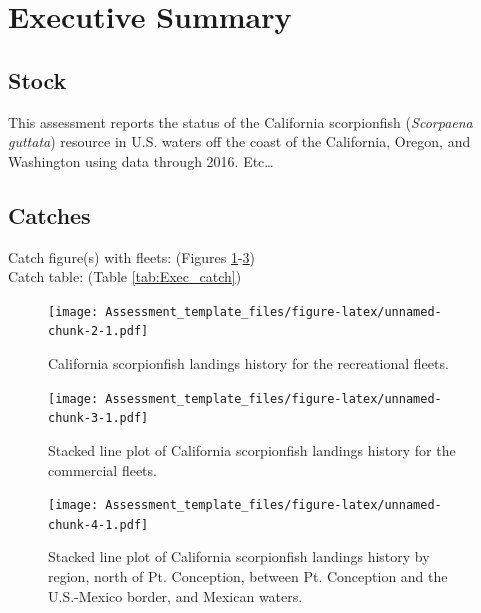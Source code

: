 \documentclass[12pt,]{article}
\begin{document}
{
\setcounter{tocdepth}{4}
\tableofcontents
}
\setlength{\parskip}{5mm plus1mm minus1mm} \pagebreak

 \setcounter{page}{1}
\renewcommand{\thefigure}{\alph{figure}}
\renewcommand{\thetable}{\alph{table}}

\section*{Executive Summary}\label{executive-summary}

\subsection*{Stock}\label{stock}

This assessment reports the status of the California scorpionfish
(\emph{Scorpaena guttata}) resource in U.S. waters off the coast of the
California, Oregon, and Washington using data through 2016. Etc\ldots{}

\subsection*{Catches}\label{catches}

Catch figure(s) with fleets: (Figures
\ref{fig:Exec_catch1}-\ref{fig:Exec_catch3})\\
Catch table: (Table \ref{tab:Exec_catch})

\FloatBarrier

\begin{figure}[htbp]
\centering
\texttt{[image: Assessment\_template\_files/figure-latex/unnamed-chunk-2-1.pdf]}
\caption{California scorpionfish landings history for the recreational
fleets. \label{fig:Exec_catch1}}
\end{figure}

\begin{figure}[htbp]
\centering
\texttt{[image: Assessment\_template\_files/figure-latex/unnamed-chunk-3-1.pdf]}
\caption{Stacked line plot of California scorpionfish landings history
for the commercial fleets. \label{fig:Exec_catch2}}
\end{figure}

\begin{figure}[htbp]
\centering
\texttt{[image: Assessment\_template\_files/figure-latex/unnamed-chunk-4-1.pdf]}
\caption{Stacked line plot of California scorpionfish landings history
by region, north of Pt. Conception, between Pt. Conception and the
U.S.-Mexico border, and Mexican waters. \label{fig:Exec_catch3}}
\end{figure}
\end{document}
